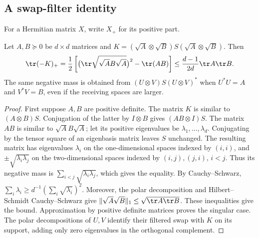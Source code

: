\subsection{A swap-filter identity}
For a Hermitian matrix $X$, write $X_+$ for its positive part.
\begin{lemma}\label{lem:swapfilter90}
Let $A,B\succeq0$ be $d\times d$ matrices and
$K=(\sqrt A\otimes\sqrt B)S(\sqrt A\otimes\sqrt B)$.  Then
\begin{equation}\label{eq:swapfilter90}
 \tr(-K)_+=\frac12\left[
  \bigl(\tr\sqrt{\sqrt A B\sqrt A}\bigr)^2-\tr(AB)\right]
 \le\frac{d-1}{2d}\tr A\tr B.
\end{equation}
The same negative mass is obtained from $(U\otimes V)S(U\otimes V)^*$
when $U^*U=A$ and $V^*V=B$, even if the receiving spaces are larger.
\end{lemma}
\begin{proof}
First suppose $A,B$ are positive definite.  The matrix $K$ is similar
to $(A\otimes B)S$.  Conjugation of the latter by $I\otimes B$ gives
$(AB\otimes I)S$.  The matrix $AB$ is similar to $\sqrt A B\sqrt A$;
let its positive eigenvalues be $\lambda_1,\ldots,\lambda_d$.
Conjugating by the tensor square of an eigenbasis matrix leaves $S$
unchanged.  The resulting matrix has eigenvalues $\lambda_i$ on the
one-dimensional spaces indexed by $(i,i)$, and
$\pm\sqrt{\lambda_i\lambda_j}$ on the two-dimensional spaces indexed
by $(i,j),(j,i)$, $i<j$.  Thus its negative mass is
$\sum_{i<j}\sqrt{\lambda_i\lambda_j}$, which gives the equality.
By Cauchy--Schwarz,
$\sum_i\lambda_i\ge d^{-1}(\sum_i\sqrt{\lambda_i})^2$.
Moreover, the polar decomposition and Hilbert--Schmidt Cauchy--Schwarz
give $\|\sqrt A\sqrt B\|_1\le\sqrt{\tr A\tr B}$.
These inequalities give the bound.  Approximation by positive definite
matrices proves the singular case.  The polar decompositions of $U,V$
identify their filtered swap with $K$ on its support, adding only zero
eigenvalues in the orthogonal complement.
\end{proof}

